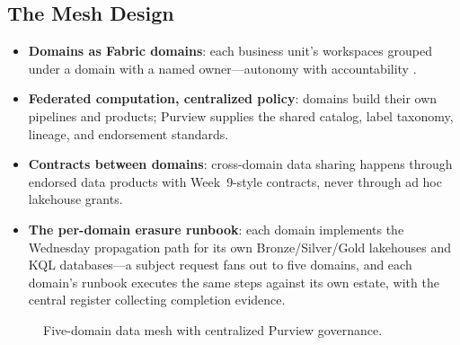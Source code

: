 \subsection{The Mesh Design}
\begin{itemize}
    \item \textbf{Domains as Fabric domains}: each business unit's workspaces grouped under a domain with a named owner---autonomy with accountability \cite{microsoftDomains}.
    \item \textbf{Federated computation, centralized policy}: domains build their own pipelines and products; Purview supplies the shared catalog, label taxonomy, lineage, and endorsement standards.
    \item \textbf{Contracts between domains}: cross-domain data sharing happens through endorsed data products with Week~9-style contracts, never through ad hoc lakehouse grants.
    \item \textbf{The per-domain erasure runbook}: each domain implements the Wednesday propagation path for its own Bronze/Silver/Gold lakehouses and KQL databases---a subject request fans out to five domains, and each domain's runbook executes the same steps against its own estate, with the central register collecting completion evidence.
\end{itemize}

\begin{figure}[H]
    \centering
    \caption{Five-domain data mesh with centralized Purview governance.}
    \label{fig:chapter22-mesh}
\end{figure}

